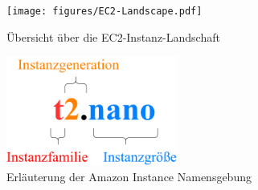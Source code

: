 \documentclass[titlepage]{report}
\begin{document}
\begin{figure}[h]
    \centering
    \texttt{[image: figures/EC2-Landscape.pdf]}
    \caption{Übersicht über die EC2\hyp{}Instanz\hyp{}Landschaft}\label{fig:2}
\end{figure}
\begin{figure}[h]
    \centering
    \includegraphics[width=0.5\textwidth]{figures/instance.pdf}
    \caption{Erläuterung der Amazon Instance Namensgebung}\label{fig:3}
\end{figure}
\end{document}
